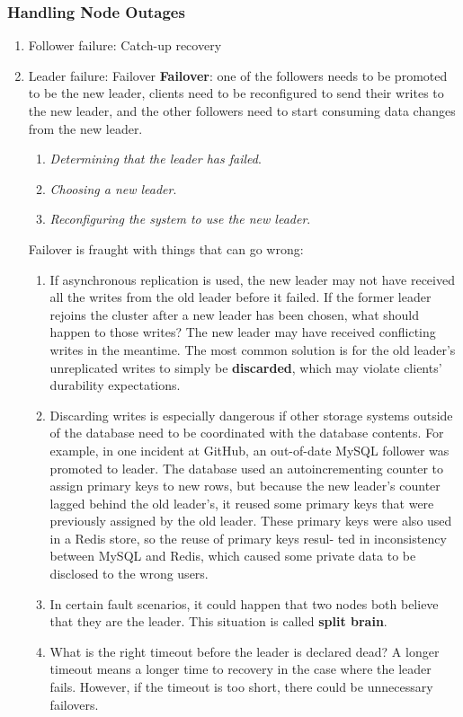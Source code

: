 \documentclass[11pt]{article}
\begin{document}
\subsubsection{Handling Node Outages}
\label{sec:org520c0af}
\begin{enumerate}
\item Follower failure: Catch-up recovery
\label{sec:org9c19399}
\item Leader failure: Failover
\label{sec:orge9c6514}
\textbf{Failover}: one of the followers needs to be promoted to be the new leader, clients need to be
reconfigured to send their writes to the new leader, and the other followers need to start
consuming data changes from the new leader.
\begin{enumerate}
\item \emph{Determining that the leader has failed}.
\item \emph{Choosing a new leader}.
\item \emph{Reconfiguring the system to use the new leader}.
\end{enumerate}


Failover is fraught with things that can go wrong:
\begin{enumerate}
\item If asynchronous replication is used, the new leader may not have received all the writes from
the old leader before it failed. If the former leader rejoins the cluster after a new leader
has been chosen, what should happen to those writes? The new leader may have received
conflicting writes in the meantime. The most common solution is for the old leader’s
unreplicated writes to simply be \textbf{discarded}, which may violate clients' durability
expectations.
\item Discarding writes is especially dangerous if other storage systems outside of the database
need to be coordinated with the database contents. For example, in one incident at GitHub, an
out-of-date MySQL follower was promoted to leader. The database used an
autoincrementing counter to assign primary keys to new rows, but because the new leader’s
counter lagged behind the old leader’s, it reused some primary keys that were previously
assigned by the old leader. These primary keys were also used in a Redis store, so the reuse
of primary keys resul‐ ted in inconsistency between MySQL and Redis, which caused some
private data to be disclosed to the wrong users.
\item In certain fault scenarios, it could happen that two nodes both believe that they are the
leader. This situation is called \textbf{split brain}.
\item What is the right timeout before the leader is declared dead? A longer timeout means a longer
time to recovery in the case where the leader fails. However, if the timeout is too short,
there could be unnecessary failovers.
\end{enumerate}
\end{enumerate}
\end{document}
